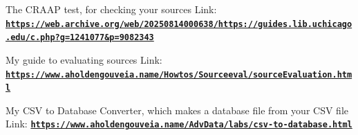 \documentclass[12pt]{article}
\begin{document}
The CRAAP test, for checking your sources
Link: \href{https://web.archive.org/web/20250814000638/https://guides.lib.uchicago.edu/c.php?g=1241077&p=9082343}{\textbf{\nolinkurl{https://web.archive.org/web/20250814000638/https://guides.lib.uchicago.edu/c.php?g=1241077&p=9082343}}}

My guide to evaluating sources
Link: \href{https://www.aholdengouveia.name/Howtos/Sourceeval/sourceEvaluation.html}{\textbf{\nolinkurl{https://www.aholdengouveia.name/Howtos/Sourceeval/sourceEvaluation.html}}}

My CSV to Database Converter, which makes a database file from your CSV file
Link: \href{https://www.aholdengouveia.name/AdvData/labs/csv-to-database.html}{\textbf{\nolinkurl{https://www.aholdengouveia.name/AdvData/labs/csv-to-database.html}}}
\end{document}

